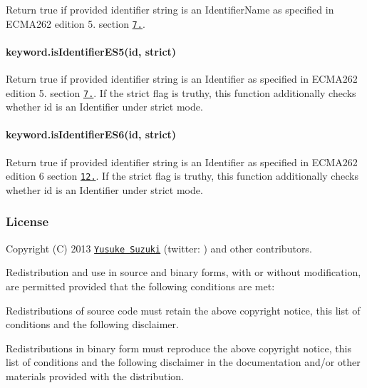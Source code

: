 Return true if provided identifier string is an Identifier\+Name as specified in E\+C\+M\+A262 edition 5. section \href{https://es5.github.io/#x7.6}{\tt 7.}.

\paragraph*{keyword.\+is\+Identifier\+E\+S5(id, strict)}

Return true if provided identifier string is an Identifier as specified in E\+C\+M\+A262 edition 5. section \href{https://es5.github.io/#x7.6}{\tt 7.}. If the {\ttfamily strict} flag is truthy, this function additionally checks whether {\ttfamily id} is an Identifier under strict mode.

\paragraph*{keyword.\+is\+Identifier\+E\+S6(id, strict)}

Return true if provided identifier string is an Identifier as specified in E\+C\+M\+A262 edition 6 section \href{https://people.mozilla.org/~jorendorff/es6-draft.html#sec-identifiers}{\tt 12.}. If the {\ttfamily strict} flag is truthy, this function additionally checks whether {\ttfamily id} is an Identifier under strict mode.

\subsubsection*{License}

Copyright (C) 2013 \href{http://github.com/Constellation}{\tt Yusuke Suzuki} (twitter\+: \href{http://twitter.com/Constellation}{\tt }) and other contributors.

Redistribution and use in source and binary forms, with or without modification, are permitted provided that the following conditions are met\+:


\begin{DoxyItemize}
\item Redistributions of source code must retain the above copyright notice, this list of conditions and the following disclaimer.
\item Redistributions in binary form must reproduce the above copyright notice, this list of conditions and the following disclaimer in the documentation and/or other materials provided with the distribution.
\end{DoxyItemize}

